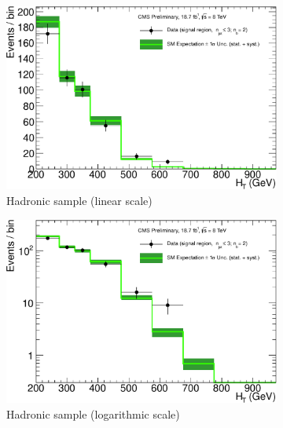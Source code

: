 \clearpage
\begin{figure}[h!]
  \centering
  \begin{subfigure}[b]{0.48\textwidth}
    \includegraphics[width=\textwidth]
    {Figs/results/v0/greenBand/single_plots/hadronic_2b_le3j.pdf}
    \caption{Hadronic sample (linear scale)}
  \end{subfigure}
  \vspace{0.7cm}\begin{subfigure}[b]{0.48\textwidth}
    \includegraphics[width=\textwidth]
    {Figs/results/v0/greenBand/single_plots/hadronic_2b_le3j_logy.pdf}
    \caption{Hadronic sample (logarithmic scale)}
  \end{subfigure}
  \begin{subfigure}[b]{0.48\textwidth}

\end{subfigure}
\end{figure}
